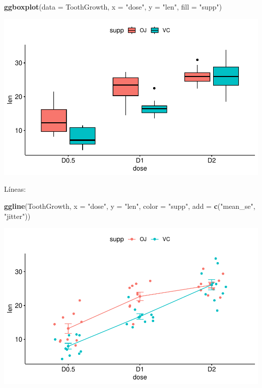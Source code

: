 \documentclass[
]{book}
\newenvironment{Shaded}{\begin{snugshade}}{\end{snugshade}}
\newcommand{\AttributeTok}[1]{\textcolor[rgb]{0.13,0.29,0.53}{#1}}
\newcommand{\FunctionTok}[1]{\textcolor[rgb]{0.13,0.29,0.53}{\textbf{#1}}}
\newcommand{\NormalTok}[1]{#1}
\newcommand{\StringTok}[1]{\textcolor[rgb]{0.31,0.60,0.02}{#1}}
\begin{document}
\begin{Shaded}
\begin{Highlighting}[]
\FunctionTok{ggboxplot}\NormalTok{(}\AttributeTok{data =}\NormalTok{ ToothGrowth, }\AttributeTok{x =} \StringTok{"dose"}\NormalTok{, }\AttributeTok{y =} \StringTok{"len"}\NormalTok{, }\AttributeTok{fill =} \StringTok{"supp"}\NormalTok{)}
\end{Highlighting}
\end{Shaded}

\includegraphics{_main_files/figure-latex/unnamed-chunk-262-3.pdf}

Líneas:

\begin{Shaded}
\begin{Highlighting}[]
\FunctionTok{ggline}\NormalTok{(ToothGrowth, }\AttributeTok{x =} \StringTok{"dose"}\NormalTok{, }\AttributeTok{y =} \StringTok{"len"}\NormalTok{, }\AttributeTok{color =} \StringTok{"supp"}\NormalTok{, }\AttributeTok{add =} \FunctionTok{c}\NormalTok{(}\StringTok{"mean\_se"}\NormalTok{, }\StringTok{"jitter"}\NormalTok{))}
\end{Highlighting}
\end{Shaded}

\includegraphics{_main_files/figure-latex/unnamed-chunk-263-1.pdf}
\end{document}
